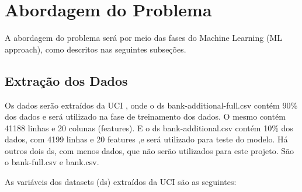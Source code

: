 \documentclass[twoside,conference,a4paper]{IEEEtran}
\begin{document}
\section{Abordagem do Problema}

A abordagem do problema será por meio das fases do Machine Learning (ML approach), como descritos nas seguintes subseções.

\subsection{Extração dos Dados}

Os dados serão extraídos da UCI \cite{UCI:2014}, onde o ds bank-additional-full.csv contém 90\% dos dados e será utilizado na fase de treinamento dos dados. O mesmo contém 41188 linhas e 20 colunas (features). E o ds bank-additional.csv contém 10\% dos dados, com 4199 linhas e 20 features ,e será utilizado para teste do modelo. Há outros dois ds, com menos dados, que não serão utilizados para este projeto. São o bank-full.csv e bank.csv.

As variáveis dos datasets (ds) extraídos da UCI \cite{UCI:2014} são as seguintes:
\end{document}
